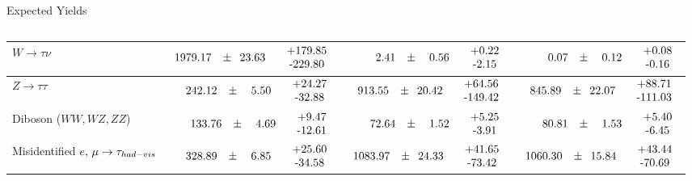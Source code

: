 \documentclass[aspectratio=169,xcolor=table]{beamer}
\begin{document}
\begin{frame}[t]{Expected Yields}
\begin{columns}
\begin{table}
{\begin{tabular}{l|r|r|r}
        $W \to \tau\nu$ & $\phantom{0}1979.17\phantom{.0}\pm\phantom{0}23.63\phantom{.0}\phantom{0}\begin{tabular}{c}+179.85 \\-229.80\end{tabular}$ & $\phantom{0000}2.41\phantom{.0}\pm\phantom{00}0.56\phantom{.0}\phantom{0}\begin{tabular}{c}+0.22 \\-2.15\end{tabular}$ & $\phantom{0000}0.07\phantom{.0}\pm\phantom{00}0.12\phantom{.0}\phantom{0}\begin{tabular}{c}+0.08 \\-0.16\end{tabular}$  \\ \hline
        $Z \to \tau\tau$ & $\phantom{00}242.12\phantom{.0}\pm\phantom{00}5.50\phantom{.0}\phantom{0}\begin{tabular}{c}+24.27 \\-32.88\end{tabular}$  & $\phantom{00}913.55\phantom{.0}\pm\phantom{0}20.42\phantom{.0}\phantom{0}\begin{tabular}{c}+64.56 \\-149.42\end{tabular}$  & $\phantom{00}845.89\phantom{.0}\pm\phantom{0}22.07\phantom{.0}\phantom{0}\begin{tabular}{c}+88.71 \\-111.03\end{tabular}$ \\ \hline
        Diboson ($WW, WZ, ZZ$) & $\phantom{00}133.76\phantom{.0}\pm\phantom{00}4.69\phantom{.0}\phantom{0}\begin{tabular}{c}+9.47 \\-12.61\end{tabular}$ &  $\phantom{000}72.64\phantom{.0}\pm\phantom{00}1.52\phantom{.0}\phantom{0}\begin{tabular}{c}+5.25 \\-3.91\end{tabular}$ & $\phantom{000}80.81\phantom{.0}\pm\phantom{00}1.53\phantom{.0}\phantom{0}\begin{tabular}{c}+5.40 \\-6.45\end{tabular}$ \\ \hline
        Misidentified $e,\,\mu \to \tau_{had-vis}$   & $\phantom{00}328.89\phantom{.0}\pm\phantom{00}6.85\phantom{.0}\phantom{0}\begin{tabular}{c}+25.60 \\-34.58\end{tabular}$ &   $\phantom{0}1083.97\phantom{.0}\pm\phantom{0}24.33\phantom{.0}\phantom{0}\begin{tabular}{c}+41.65 \\-73.42\end{tabular}$ & $\phantom{0}1060.30\phantom{.0}\pm\phantom{0}15.84\phantom{.0}\phantom{0}\begin{tabular}{c}+43.44 \\-70.69\end{tabular}$ \\ \hline

\end{tabular}}
\end{table}
\end{columns}
\end{frame}
\end{document}
